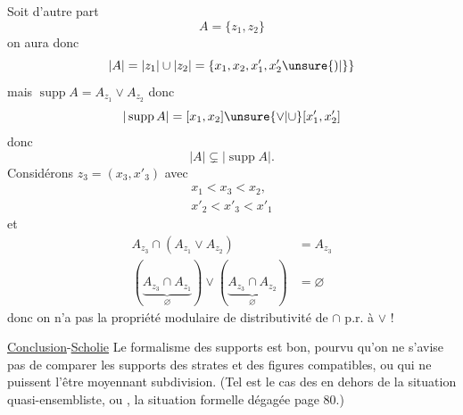 Soit d'autre part
\[
A=\{z_1,z_2\}
\]
on aura donc
\[
|A|=|z_1|\cup|z_2|=\{x_1,x_2,x'_1,x'_2\unsure{)|\}}
\]
mais $\operatorname{supp}A=A_{z_1}\vee A_{z_2}$ donc
\[
|\operatorname{supp}A|=[x_1,x_2]\unsure{\vee|\cup}[x'_1,x'_2]
\]
 donc
\[
|A|\subsetneq|\operatorname{supp}A|.
\]
Considérons  $z_3=(x_3,x'_3)$ avec
\[
\begin{aligned}
x_1<x_3<x_2,\\
x'_2<x'_3<x'_1
\end{aligned}
\]
et
\[
\begin{aligned}
A_{z_3}\cap(A_{z_1}\vee A_{z_2})&=A_{z_3}\\
(\underbrace{A_{z_3}\cap A_{z_1}}_{\varnothing})\vee(\underbrace{A_{z_3}\cap A_{z_2}}_{\varnothing})&=\varnothing
\end{aligned}
\]
donc on n'a pas la propriété modulaire de distributivité de $\cap$ p.r. à $\vee$ !

\uline{Conclusion}-\uline{Scholie} Le formalisme des supports est bon,  pourvu qu'on ne s'avise pas de comparer les supports des strates et des figures   compatibles, ou qui ne puissent l'être moyennant subdivision. (Tel est le cas des  en dehors de la situation quasi-ensembliste, ou , la situation formelle dégagée page $80$.)
